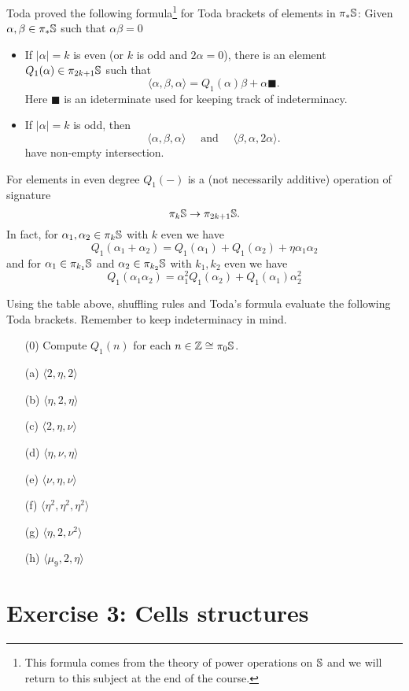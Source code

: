 \documentclass[reqno]{amsart}
\begin{document}
Toda proved the following formula\footnote{This formula comes from the theory of power operations on $\mathbb{S}$ and we will return to this subject at the end of the course.} for Toda brackets of elements in $\pi_*\mathbb{S}$:
Given $\alpha, \beta \in \pi_*\mathbb{S}$ such that $\alpha\beta = 0$
\begin{itemize}
\item If $|\alpha| = k$ is even (or $k$ is odd and $2\alpha =0$),
  there is an element $Q_1(\alpha) \in \pi_{2k+1}\mathbb{S}$ such that
  \[ \langle \alpha, \beta, \alpha \rangle = Q_1(\alpha) \beta + \alpha \blacksquare. \]
  Here $\blacksquare$ is an ideterminate used for keeping track of indeterminacy.
\item If $|\alpha| = k$ is odd, then   
  \[ \langle \alpha, \beta, \alpha \rangle \quad\text{ and }\quad \langle \beta, \alpha, 2\alpha \rangle. \]
  have non-empty intersection.
\end{itemize}
For elements in even degree $Q_1(-)$ is a (not necessarily additive) operation of signature
\[ \pi_k\mathbb{S} \to \pi_{2k+1}\mathbb{S}. \]
In fact, for $\alpha_1, \alpha_2 \in \pi_k\mathbb{S}$ with $k$ even we have
\[ Q_1(\alpha_1 + \alpha_2) = Q_1(\alpha_1) + Q_1(\alpha_2) + \eta \alpha_1 \alpha_2 \]
and for $\alpha_1 \in \pi_{k_1}\mathbb{S}$ and $\alpha_2 \in \pi_{k_2}\mathbb{S}$ with $k_1,k_2$ even we have
\[ Q_1(\alpha_1 \alpha_2) = \alpha_1^2 Q_1(\alpha_2) + Q_1(\alpha_1) \alpha_2^2 \]

Using the table above, shuffling rules and Toda's formula evaluate the following Toda brackets.
Remember to keep indeterminacy in mind.

\begin{enumerate}
\item[(0)] Compute $Q_1(n)$ for each $n \in \mathbb{Z} \cong \pi_0\mathbb{S}$.
\item[(a)] $\langle 2, \eta, 2 \rangle$
\item[(b)] $\langle \eta, 2, \eta \rangle$
\item[(c)] $\langle 2, \eta, \nu \rangle$
\item[(d)] $\langle \eta, \nu, \eta \rangle$
\item[(e)] $\langle \nu, \eta, \nu \rangle$
\item[(f)] $\langle \eta^2, \eta^2, \eta^2 \rangle$
\item[(g)] $\langle \eta, 2, \nu^2 \rangle$
\item[(h)] $\langle \mu_9, 2, \eta \rangle$
\end{enumerate}

\section{\bf Exercise 3: Cells structures}
\end{document}
